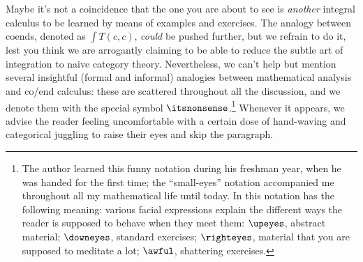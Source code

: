 Maybe it's not a coincidence that the one you are about to see is \emph{another} integral calculus to be learned by means of examples and exercises. The analogy between coends, denoted as $\int T(c,c)$, \emph{could} be pushed further, but we refrain to do it, lest you think we are arrogantly claiming to be able to reduce the subtle art of integration to naive category theory. Nevertheless, we can't help but mention several insightful (formal and informal) analogies between mathematical analysis and co/end calculus: these are scattered throughout all the discussion, and we denote them with the special symbol $\itsnonsense$.\footnote{The author learned this funny notation during his freshman year, when he was handed \cite{de1996analisi} for the first time; the ``small\hyp{}eyes'' notation accompanied me throughout all my mathematical life until today. In \cite{de1996analisi} this notation has the following meaning: various facial expressions explain the different ways the reader is supposed to behave when they meet them: $\upeyes$, abstract material; $\downeyes$, standard exercises; $\righteyes$, material that you are supposed to meditate a lot; $\awful$, shattering exercises.} Whenever it appears, we advise the reader feeling uncomfortable with a certain dose of hand-waving and categorical juggling to raise their eyes and skip the paragraph.




